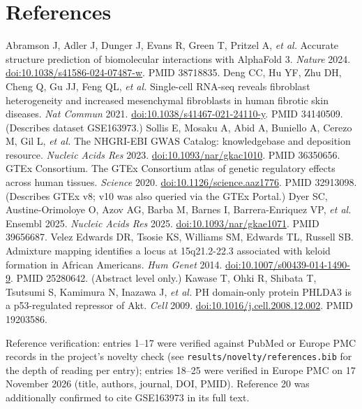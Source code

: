 \documentclass[10pt,twocolumn,a4paper]{article}
\makeatletter
\renewenvironment{thebibliography}[1]{\section*{References}\small\list{\@biblabel{\@arabic\c@enumiv}}{\settowidth\labelwidth{[99]}\leftmargin\labelwidth\advance\leftmargin\labelsep\setlength{\itemsep}{1.5pt}\setlength{\parsep}{0pt}\usecounter{enumiv}\renewcommand\theenumiv{\@arabic\c@enumiv}}\raggedright}{\endlist}
\makeatother
\begin{document}
\begin{thebibliography}{99}
 Abramson J, Adler J, Dunger J, Evans R, Green T, Pritzel A, \emph{et al.} Accurate structure prediction of biomolecular interactions with AlphaFold 3. \emph{Nature} 2024. \href{https://doi.org/10.1038/s41586-024-07487-w}{doi:10.1038/s41586-024-07487-w}. PMID 38718835.
 Deng CC, Hu YF, Zhu DH, Cheng Q, Gu JJ, Feng QL, \emph{et al.} Single-cell RNA-seq reveals fibroblast heterogeneity and increased mesenchymal fibroblasts in human fibrotic skin diseases. \emph{Nat Commun} 2021. \href{https://doi.org/10.1038/s41467-021-24110-y}{doi:10.1038/s41467-021-24110-y}. PMID 34140509. (Describes dataset GSE163973.)
 Sollis E, Mosaku A, Abid A, Buniello A, Cerezo M, Gil L, \emph{et al.} The NHGRI-EBI GWAS Catalog: knowledgebase and deposition resource. \emph{Nucleic Acids Res} 2023. \href{https://doi.org/10.1093/nar/gkac1010}{doi:10.1093/nar/gkac1010}. PMID 36350656.
 GTEx Consortium. The GTEx Consortium atlas of genetic regulatory effects across human tissues. \emph{Science} 2020. \href{https://doi.org/10.1126/science.aaz1776}{doi:10.1126/science.aaz1776}. PMID 32913098. (Describes GTEx v8; v10 was also queried via the GTEx Portal.)
 Dyer SC, Austine-Orimoloye O, Azov AG, Barba M, Barnes I, Barrera-Enriquez VP, \emph{et al.} Ensembl 2025. \emph{Nucleic Acids Res} 2025. \href{https://doi.org/10.1093/nar/gkae1071}{doi:10.1093/nar/gkae1071}. PMID 39656687.
 Velez Edwards DR, Tsosie KS, Williams SM, Edwards TL, Russell SB. Admixture mapping identifies a locus at 15q21.2-22.3 associated with keloid formation in African Americans. \emph{Hum Genet} 2014. \href{https://doi.org/10.1007/s00439-014-1490-9}{doi:10.1007/s00439-014-1490-9}. PMID 25280642. (Abstract level only.)
 Kawase T, Ohki R, Shibata T, Tsutsumi S, Kamimura N, Inazawa J, \emph{et al.} PH domain-only protein PHLDA3 is a p53-regulated repressor of Akt. \emph{Cell} 2009. \href{https://doi.org/10.1016/j.cell.2008.12.002}{doi:10.1016/j.cell.2008.12.002}. PMID 19203586.
\end{thebibliography}

\vspace{6pt}
{\footnotesize Reference verification: entries 1--17 were verified against PubMed or Europe PMC records in the project's novelty check (see \texttt{results/novelty/references.bib} for the depth of reading per entry); entries 18--25 were verified in Europe PMC on 17 November 2026 (title, authors, journal, DOI, PMID). Reference 20 was additionally confirmed to cite GSE163973 in its full text.\par}
\end{document}
